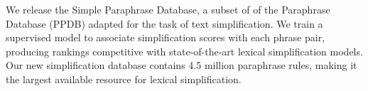 We release the Simple Paraphrase Database, a subset of of the Paraphrase Database (PPDB) adapted for the task of text simplification. We train a supervised model to associate simplification scores with each phrase pair, producing rankings competitive with state-of-the-art lexical simplification models. Our new simplification database contains 4.5 million paraphrase rules, making it the largest available resource for lexical simplification.
